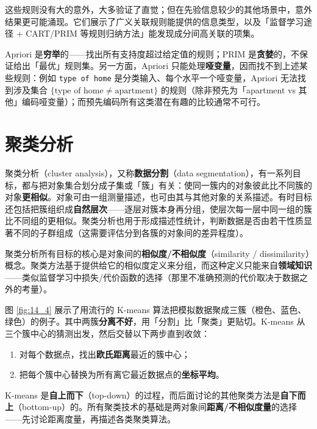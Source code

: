这些规则没有大的意外，大多验证了直觉；但在先验信息较少的其他场景中，意外结果更可能涌现。它们展示了广义关联规则能提供的信息类型，以及「监督学习途径 + CART/PRIM 等规则归纳方法」能发现成分间高关联的项集。

\begin{remark}
Apriori 是\textbf{穷举}的——找出所有支持度超过给定值的规则；PRIM 是\textbf{贪婪}的，不保证给出「最优」规则集。另一方面，Apriori 只能处理\textbf{哑变量}，因而找不到上述某些规则：例如 \texttt{type of home} 是分类输入、每个水平一个哑变量，Apriori 无法找到涉及集合 $\{\text{type of home}\ne\text{apartment}\}$ 的规则（除非预先为「apartment vs 其他」编码哑变量）；而预先编码所有这类潜在有趣的比较通常不可行。
\end{remark}

\section{聚类分析}

聚类分析（cluster analysis），又称\textbf{数据分割}（data segmentation），有一系列目标，都与把对象集合划分成子集或「簇」有关：使同一簇内的对象彼此比不同簇的对象\textbf{更相似}。对象可由一组测量描述，也可由其与其他对象的关系描述。有时目标还包括把簇组织成\textbf{自然层次}——逐层对簇本身再分组，使层次每一层中同一组的簇比不同组的更相似。聚类分析也用于形成描述性统计，判断数据是否由若干性质显著不同的子群组成（这需要评估分到各簇的对象间的差异程度）。

\begin{remark}[相似度量的核心地位]
聚类分析所有目标的核心是对象间的\textbf{相似度/不相似度}（similarity / dissimilarity）概念。聚类方法基于提供给它的相似度定义来分组，而这种定义只能来自\textbf{领域知识}——类似监督学习中损失/代价函数的选择（那里不准确预测的代价取决于数据之外的考量）。
\end{remark}

图 \ref{fig:14_4} 展示了用流行的 K-means 算法把模拟数据聚成三簇（橙色、蓝色、绿色）的例子。其中两簇\textbf{分离不好}，用「分割」比「聚类」更贴切。K-means 从三个簇中心的猜测出发，然后交替以下两步直到收敛：
\begin{enumerate}[itemsep=1pt]
\item 对每个数据点，找出\textbf{欧氏距离}最近的簇中心；
\item 把每个簇中心替换为所有离它最近数据点的\textbf{坐标平均}。
\end{enumerate}
K-means 是\textbf{自上而下}（top-down）的过程，而后面讨论的其他聚类方法是\textbf{自下而上}（bottom-up）的。所有聚类技术的基础是两对象间\textbf{距离/不相似度量}的选择——先讨论距离度量，再描述各类聚类算法。

